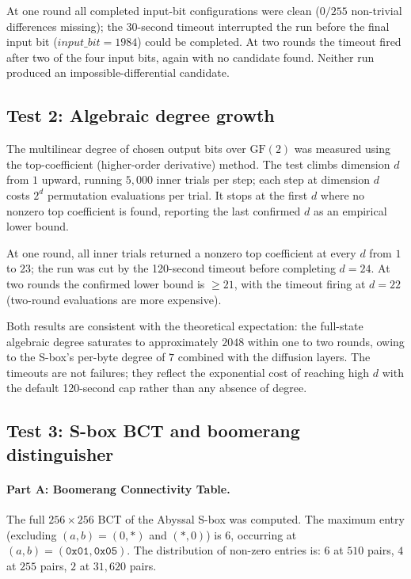 \documentclass[11pt,a4paper]{article}
\begin{document}
At one round all completed input-bit configurations were clean ($0/255$
non-trivial differences missing); the 30-second timeout interrupted the run
before the final input bit ($\mathit{input\_bit} = 1984$) could be completed.
At two rounds the timeout fired after two of the four input bits, again with no
candidate found.  Neither run produced an impossible-differential candidate.

\subsection{Test 2: Algebraic degree growth}

The multilinear degree of chosen output bits over $\mathrm{GF}(2)$ was measured
using the top-coefficient (higher-order derivative) method.  The test climbs
dimension $d$ from $1$ upward, running $5{,}000$ inner trials per step; each
step at dimension $d$ costs $2^d$ permutation evaluations per trial.  It stops
at the first $d$ where no nonzero top coefficient is found, reporting the last
confirmed $d$ as an empirical lower bound.

At one round, all inner trials returned a nonzero top coefficient at every
$d$ from $1$ to $23$; the run was cut by the 120-second timeout before
completing $d = 24$.  At two rounds the confirmed lower bound is $\ge 21$,
with the timeout firing at $d = 22$ (two-round evaluations are more expensive).

Both results are consistent with the theoretical expectation: the full-state
algebraic degree saturates to approximately $2048$ within one to two rounds,
owing to the S-box's per-byte degree of $7$ combined with the diffusion layers.
The timeouts are not failures; they reflect the exponential cost of reaching
high $d$ with the default 120-second cap rather than any absence of degree.

\subsection{Test 3: S-box BCT and boomerang distinguisher}

\paragraph{Part A: Boomerang Connectivity Table.}
The full $256 \times 256$ BCT of the Abyssal S-box was computed.  The maximum
entry (excluding $(a,b) = (0,\ast)$ and $(\ast,0)$) is $6$, occurring at
$(a, b) = (\texttt{0x01}, \texttt{0x05})$.  The distribution of non-zero
entries is: $6$ at $510$ pairs, $4$ at $255$ pairs, $2$ at $31{,}620$ pairs.
\end{document}

